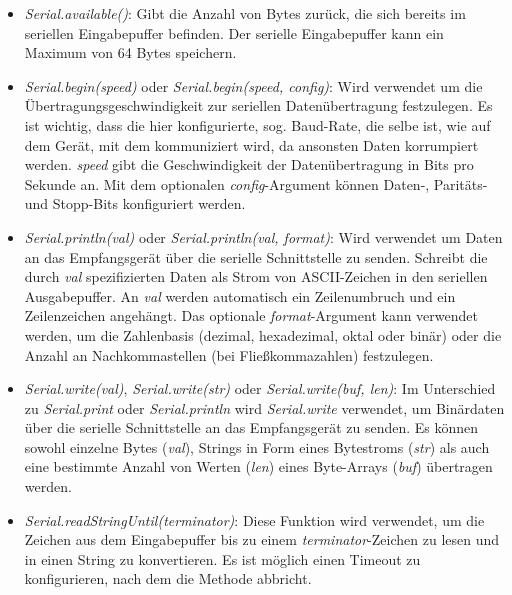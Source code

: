 \begin{itemize}
    \begin{itemize}
        \item \textit{Serial.available()}: Gibt die Anzahl von Bytes zurück, die sich bereits im seriellen Eingabepuffer befinden. Der serielle Eingabepuffer kann ein Maximum von 64 Bytes speichern.
        \item \textit{Serial.begin(speed)} oder \textit{Serial.begin(speed, config)}: Wird verwendet um die Übertragungsgeschwindigkeit zur seriellen Datenübertragung festzulegen. Es ist wichtig, dass die hier konfigurierte, sog. \glqq{}Baud-Rate\grqq{}, die selbe ist, wie auf dem Gerät, mit dem kommuniziert wird, da ansonsten Daten korrumpiert werden. \textit{speed} gibt die Geschwindigkeit der Datenübertragung in Bits pro Sekunde an. Mit dem optionalen \textit{config}-Argument können Daten-, Paritäts- und Stopp-Bits konfiguriert werden.
        \item \textit{Serial.println(val)} oder \textit{Serial.println(val, format)}: Wird verwendet um Daten an das Empfangsgerät über die serielle Schnittstelle zu senden. Schreibt die durch \textit{val} spezifizierten Daten als Strom von ASCII-Zeichen in den seriellen Ausgabepuffer. An \textit{val} werden automatisch ein Zeilenumbruch und ein Zeilenzeichen angehängt. Das optionale \textit{format}-Argument kann verwendet werden, um die Zahlenbasis (dezimal, hexadezimal, oktal oder binär) oder die Anzahl an Nachkommastellen (bei Fließkommazahlen) festzulegen.
        \item \textit{Serial.write(val)}, \textit{Serial.write(str)} oder \textit{Serial.write(buf, len)}: Im Unterschied zu \textit{Serial.print} oder \textit{Serial.println} wird \textit{Serial.write} verwendet, um Binärdaten über die serielle Schnittstelle an das Empfangsgerät zu senden. Es können sowohl einzelne Bytes (\textit{val}), Strings in Form eines Bytestroms (\textit{str}) als auch eine bestimmte Anzahl von Werten (\textit{len}) eines Byte-Arrays (\textit{buf}) übertragen werden.
        \item \textit{Serial.readStringUntil(terminator)}: Diese Funktion wird verwendet, um die Zeichen aus dem Eingabepuffer bis zu einem \textit{terminator}-Zeichen zu lesen und in einen String zu konvertieren. Es ist möglich einen Timeout zu konfigurieren, nach dem die Methode abbricht.
    \end{itemize}
\end{itemize}
